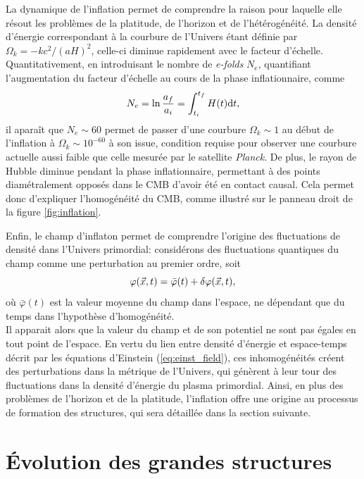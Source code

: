 La dynamique de l'inflation permet de comprendre la raison pour laquelle elle résout les problèmes de la platitude, de l'horizon et de l'hétérogénéité.
La densité d'énergie correspondant à la courbure de l'Univers étant définie par $\Omega_k = -kc^2 / (aH)^2$, celle-ci diminue rapidement avec le facteur d'échelle.
Quantitativement, en introduisant le nombre de \textit{e-folds} $N_e$, quantifiant l'augmentation du facteur d'échelle au cours de la phase inflationnaire, comme
\begin{equation}
    N_e = \ln \frac{a_f}{a_i} = \int_{t_i}^{t_f} H(t) \mathrm{d} t,
\end{equation}
il aparaît que $N_e \sim 60$ permet de passer d'une courbure $\Omega_k \sim 1$ au début de l'inflation à $\Omega_k \sim 10^{-60}$ à son issue, condition requise pour observer une courbure actuelle aussi faible que celle mesurée par le satellite \textit{Planck}.
De plus, le rayon de Hubble diminue pendant la phase inflationnaire, permettant à des points diamétralement opposés dans le CMB d'avoir été en contact causal.
Cela permet donc d'expliquer l'homogénéité du CMB, comme illustré sur le panneau droit de la figure \ref{fig:inflation}.

Enfin, le champ d'inflaton permet de comprendre l'origine des fluctuations de densité dans l'Univers primordial: considérons des fluctuations quantiques du champ comme une perturbation au premier ordre, soit
\begin{equation}
    \varphi(\vec{x}, t) = \bar{\varphi}(t) + \delta\varphi(\vec{x}, t),
\end{equation}
où $\bar{\varphi}(t)$ est la valeur moyenne du champ dans l'espace, ne dépendant que du temps dans l'hypothèse d'homogénéité. \\
Il apparait alors que la valeur du champ et de son potentiel ne sont pas égales en tout point de l'espace.
En vertu du lien entre densité d'énergie et espace-temps décrit par les équations d'Einstein (\ref{eq:einst_field}), ces inhomogénéités créent des perturbations dans la métrique de l'Univers, qui génèrent à leur tour des fluctuations dans la densité d'énergie du plasma primordial.
Ainsi, en plus des problèmes de l'horizon et de la platitude, l'inflation offre une origine au processus de formation des structures, qui sera détaillée dans la section suivante.

\section{Évolution des grandes structures}

